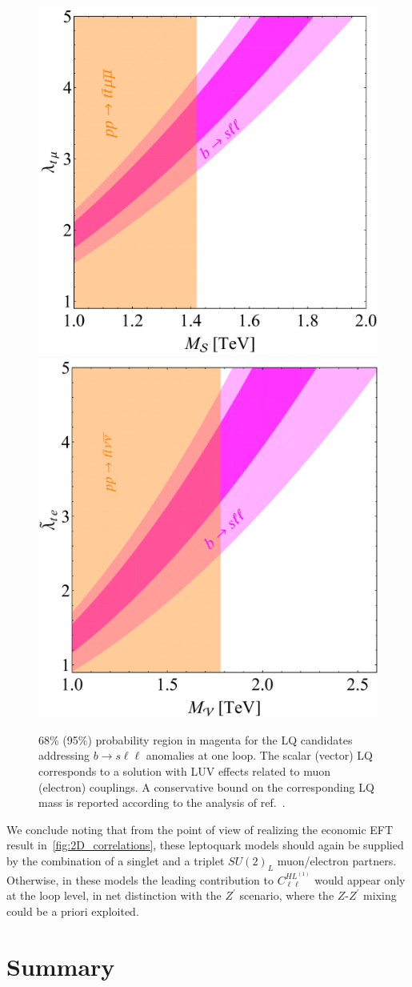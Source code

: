 \begin{figure}[htpb!]
	\centering 
	\includegraphics[width=0.45\linewidth]{figures/Scalar_LQ.pdf}
	\includegraphics[width=0.435\linewidth]{figures/Vector_LQ.pdf}
	\caption{68\% (95\%) probability region in magenta for the LQ candidates addressing $b \to s \ell \ell$ anomalies at one loop. The scalar (vector) LQ corresponds to a solution with LUV effects related to muon (electron) couplings. A conservative bound on the corresponding LQ mass is reported according to the analysis of ref.~\cite{Angelescu:2018tyl}.}    
	\label{fig:LQ_constraints}
\end{figure}

We conclude noting that from the point of view of realizing the economic EFT result in~\autoref{fig:2D_correlations}, these leptoquark models should again be supplied by the combination of a singlet and a triplet $SU(2)_{L}$ muon/electron partners. Otherwise, in these models the leading contribution to $C^{HL^{(1)}}_{\ell\ell}$ would appear only at the loop level, in net distinction with the $Z^{\prime}$ scenario, where the $Z$-$Z^{\prime}$ mixing could be a priori exploited.

\section{Summary}
\label{sec:sum}

